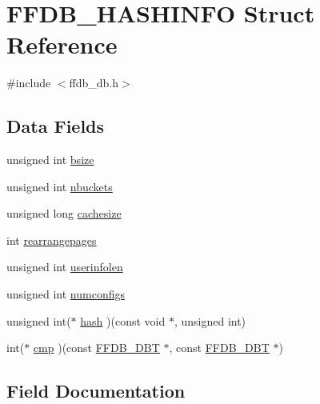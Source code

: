 \hypertarget{structFFDB__HASHINFO}{}\section{F\+F\+D\+B\+\_\+\+H\+A\+S\+H\+I\+N\+FO Struct Reference}
\label{structFFDB__HASHINFO}


{\ttfamily \#include $<$ffdb\+\_\+db.\+h$>$}

\subsection*{Data Fields}
\begin{DoxyCompactItemize}
\item 
unsigned int \mbox{\hyperlink{structFFDB__HASHINFO_ab87eb9b241c5c6028a766ef419fb7a9f}{bsize}}
\item 
unsigned int \mbox{\hyperlink{structFFDB__HASHINFO_aa4a10df8b4ccdd1ac58b4655a943db0d}{nbuckets}}
\item 
unsigned long \mbox{\hyperlink{structFFDB__HASHINFO_aa04759ec519e79ce156d42660acafb7f}{cachesize}}
\item 
int \mbox{\hyperlink{structFFDB__HASHINFO_a2399ac211531c76b33d9e34ed60a86c9}{rearrangepages}}
\item 
unsigned int \mbox{\hyperlink{structFFDB__HASHINFO_ab4185e8dc1347babf4e17733755073de}{userinfolen}}
\item 
unsigned int \mbox{\hyperlink{structFFDB__HASHINFO_a6f03a772f4e63a8b7bed61705406f9b7}{numconfigs}}
\item 
unsigned int($\ast$ \mbox{\hyperlink{structFFDB__HASHINFO_af4b51f3d6131122f6f375d688d6752aa}{hash}} )(const void $\ast$, unsigned int)
\item 
int($\ast$ \mbox{\hyperlink{structFFDB__HASHINFO_a2c214c2327e467cdb235487f023ddc78}{cmp}} )(const \mbox{\hyperlink{adat-devel_2other__libs_2filedb_2filehash_2ffdb__db_8h_aa2e0984399491df0fdd20898ca8758f9}{F\+F\+D\+B\+\_\+\+D\+BT}} $\ast$, const \mbox{\hyperlink{adat-devel_2other__libs_2filedb_2filehash_2ffdb__db_8h_aa2e0984399491df0fdd20898ca8758f9}{F\+F\+D\+B\+\_\+\+D\+BT}} $\ast$)
\end{DoxyCompactItemize}


\subsection{Field Documentation}
\mbox{\label{structFFDB__HASHINFO_ab87eb9b241c5c6028a766ef419fb7a9f}} 

